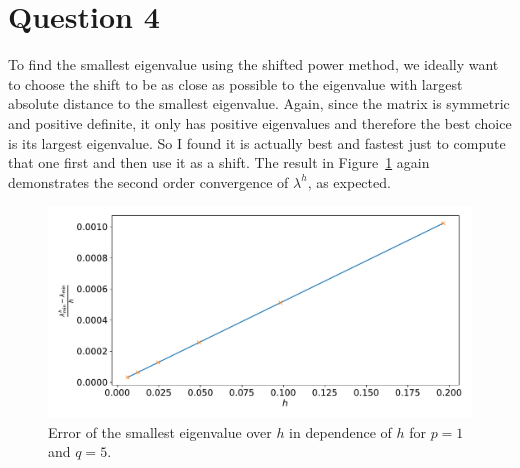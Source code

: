 \documentclass[a4paper, 11pt]{article}
\begin{document}
{\FloatBarrier
\section*{Question 4}
To find the smallest eigenvalue using the shifted power method, we ideally want
to choose the shift to be as close as possible to the eigenvalue with largest
absolute distance to the smallest eigenvalue. Again, since the matrix is
symmetric and positive definite, it only has positive eigenvalues and therefore
the best choice is its largest eigenvalue. So I found it is actually best and
fastest just to compute that one first and then use it as a shift. The result
in Figure~\ref{fig:4} again demonstrates the second order convergence of
$\lambda^h$, as expected.
\begin{figure}
  \centering
  \includegraphics[width=\textwidth]{../code/5.pdf}
  \caption{Error of the smallest eigenvalue over $h$ in dependence of $h$ for
  $p = 1$ and $q = 5$.}
  \label{fig:4}
\end{figure}

\FloatBarrier
}
\end{document}
